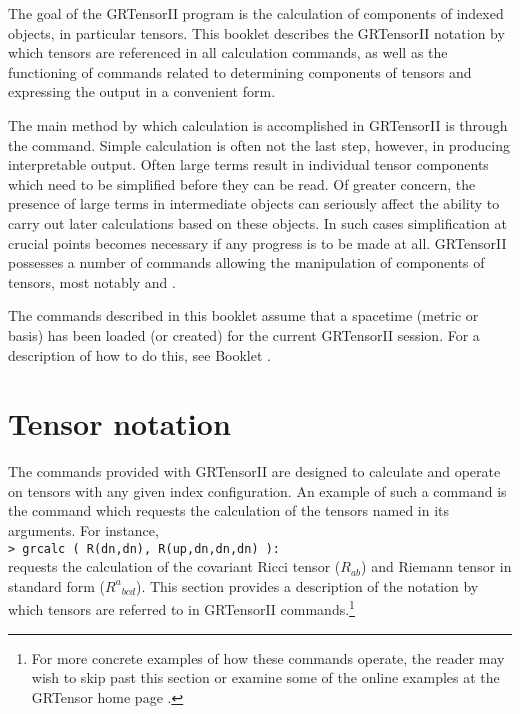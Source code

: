 \documentclass{article}
\begin{document}
\grlabel{\grCalcLabel}
\grtitle{\grCalcTitle}
\grtitlepage
\copyrightpage
\noindent The goal of the GRTensorII program is the calculation of
components of indexed objects, in particular tensors. This booklet
describes the GRTensorII notation by which tensors are referenced in
all calculation commands, as well as the functioning of commands
related to determining components of tensors and expressing the output
in a convenient form.

The main method by which calculation is accomplished in GRTensorII is
through the  command.  Simple calculation is often not
the last step, however, in producing interpretable output. Often large
terms result in individual tensor components which need to be
simplified before they can be read. Of greater concern, the presence
of large terms in intermediate objects can seriously affect the
ability to carry out later calculations based on these objects. In
such cases simplification at crucial points becomes necessary if any
progress is to be made at all. GRTensorII possesses a number of
commands allowing the manipulation of components of tensors, most
notably  and .

The commands described in this booklet assume that a spacetime (metric
or basis) has been loaded (or created) for the current GRTensorII session.
For a description of how to do this, see Booklet \grMakegRef.
%
\section{Tensor notation} \label{sec:indices}
%
The commands provided with GRTensorII are designed to calculate and operate
on tensors with any given index configuration. An example of such a command
is the  command which requests the calculation of the tensors
named in its arguments. For instance,\\

\noindent\texttt{> grcalc ( R(dn,dn), R(up,dn,dn,dn) ):}\\

\noindent requests the calculation of the covariant Ricci tensor ($R_{ab}$)
and Riemann tensor in standard form ($R^a{}_{bcd}$). This section provides
a description of the notation by which tensors are referred to in GRTensorII
commands.\footnote{For more concrete examples of how these commands operate,
the reader may wish to skip past this section or examine some
of the online examples at the GRTensor home page \cite{www}.}
%
\end{document}
